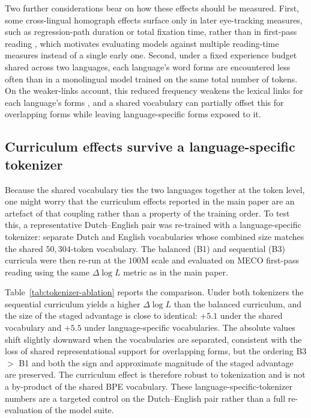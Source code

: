 Two further considerations bear on how these effects should be measured. First, some cross-lingual homograph effects surface only in later eye-tracking measures, such as regression-path duration or total fixation time, rather than in first-pass reading \citep{hoversten2016time}, which motivates evaluating models against multiple reading-time measures instead of a single early one. Second, under a fixed experience budget shared across two languages, each language's word forms are encountered less often than in a monolingual model trained on the same total number of tokens. On the weaker-links account, this reduced frequency weakens the lexical links for each language's forms \citep{gollan2008weaker,whitford2015second}, and a shared vocabulary can partially offset this for overlapping forms while leaving language-specific forms exposed to it.

\subsection{Curriculum effects survive a language-specific tokenizer}

Because the shared vocabulary ties the two languages together at the token level, one might worry that the curriculum effects reported in the main paper are an artefact of that coupling rather than a property of the training order. To test this, a representative Dutch--English pair was re-trained with a language-specific tokenizer: separate Dutch and English vocabularies whose combined size matches the shared $50{,}304$-token vocabulary. The balanced (B1) and sequential (B3) curricula were then re-run at the $100$M scale and evaluated on MECO first-pass reading using the same $\Delta\log L$ metric as in the main paper.

Table~\ref{tab:tokenizer-ablation} reports the comparison. Under both tokenizers the sequential curriculum yields a higher $\Delta\log L$ than the balanced curriculum, and the size of the staged advantage is close to identical: $+5.1$ under the shared vocabulary and $+5.5$ under language-specific vocabularies. The absolute values shift slightly downward when the vocabularies are separated, consistent with the loss of shared representational support for overlapping forms, but the ordering B3 $>$ B1 and both the sign and approximate magnitude of the staged advantage are preserved. The curriculum effect is therefore robust to tokenization and is not a by-product of the shared BPE vocabulary. These language-specific-tokenizer numbers are a targeted control on the Dutch--English pair rather than a full re-evaluation of the model suite.

